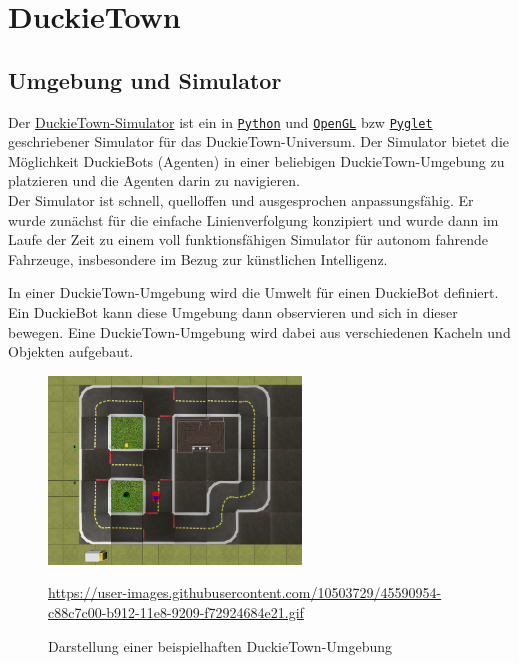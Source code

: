 \chapter{DuckieTown}

\section{Umgebung und Simulator}


Der \href{https://github.com/duckietown/gym-duckietown}{DuckieTown-Simulator} ist ein in \href{https://www.python.org/}{\texttt{Python}} und \href{https://www.opengl.org/}{\texttt{OpenGL}} \acf{bzw} \href{http://pyglet.org/}{\texttt{Pyglet}} geschriebener Simulator für das \glqq DuckieTown-Universum\grqq. Der Simulator bietet die Möglichkeit DuckieBots (Agenten) in einer beliebigen DuckieTown-Umgebung zu platzieren und die Agenten darin zu navigieren. \cite{gym_duckietown} \\

Der Simulator ist schnell, quelloffen und ausgesprochen anpassungsfähig. Er wurde zunächst für die einfache Linienverfolgung konzipiert und wurde dann im Laufe der Zeit zu einem voll funktionsfähigen Simulator für autonom fahrende Fahrzeuge, insbesondere im Bezug zur künstlichen Intelligenz. \cite{gym_duckietown}

In einer DuckieTown-Umgebung wird die Umwelt für einen DuckieBot definiert. Ein DuckieBot kann diese Umgebung dann observieren und sich in dieser bewegen. Eine DuckieTown-Umgebung wird dabei aus verschiedenen Kacheln und Objekten aufgebaut. 

\begin{figure}[H]
	\centering
	\includegraphics[width=0.6\textwidth]{kapitel2/images/duckietown-umgebung.png}
	\label{fig:duckietown-umgebung}
	\caption{Darstellung einer beispielhaften DuckieTown-Umgebung}
	\vspace{0.2cm}
	\quelle\url{https://user-images.githubusercontent.com/10503729/45590954-c88c7c00-b912-11e8-9209-f72924684e21.gif}
\end{figure}

